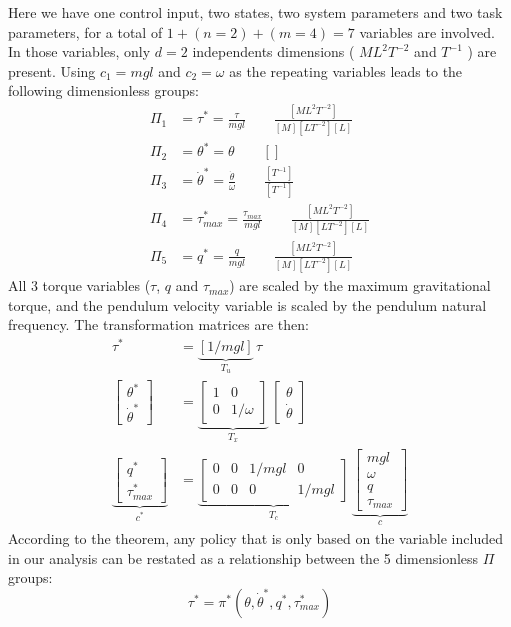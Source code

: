 Here we have one control input, two states, two system parameters and two task parameters, for a total of $1+(n=2)+(m=4)=7$ variables are involved. In those variables, only $d=2$ independents dimensions ( $ML^2T^{-2}$ and $T^{-1}$ ) are present. Using $c_1 = mgl$ and $c_2 = \omega$ as the repeating variables leads to the following dimensionless groups:
\begin{align}
\Pi_1 &= \tau^* = \frac{\tau}{mgl} \quad \quad \frac{[ML^2T^{-2}]}{[M][LT^{-2}][L]} \\
\Pi_2 &= \theta^* = \theta \quad \quad []\\
\Pi_3 &= \dot{\theta}^* = \frac{ \dot{\theta}  }{ \omega } \quad \quad \frac{[T^{-1}]}{[T^{-1}]} \\
\Pi_4 &= \tau_{max}^* = \frac{\tau_{max}}{mgl} \quad \quad \frac{[ML^2T^{-2}]}{[M][LT^{-2}][L]} \\
\Pi_5 &= q^* = \frac{q}{mgl} \quad \quad \frac{[ML^2T^{-2}]}{[M][LT^{-2}][L]} 
\end{align}
All 3 torque variables ($\tau$, $q$ and $\tau_{max}$) are scaled by the maximum gravitational torque, and the pendulum velocity variable is scaled by the pendulum natural frequency. The transformation matrices are then:
\begin{align}
\tau^* &= 
\underbrace{\left[  1/mgl \right]}_{T_u}
\, \tau  \label{eq:Tupendulum} \\
\begin{bmatrix}
\theta^* \\ \dot{\theta}^*
\end{bmatrix} &= 
\underbrace{
\begin{bmatrix}
    1 & 0 \\ 0 & 1/\omega
\end{bmatrix}
}_{T_x} \, 
\begin{bmatrix}
\theta \\ \dot{\theta}
\end{bmatrix}
 \label{eq:Txpendulum} \\
\underbrace{
\begin{bmatrix}
q^* \\ \tau_{max}^*
\end{bmatrix} 
}_{c^*} 
&= 
\underbrace{
\begin{bmatrix}
 0 & 0  & 1/mgl & 0 \\  0 & 0  & 0 &  1/mgl
\end{bmatrix}
}_{T_c} \, 
\underbrace{
\begin{bmatrix}
mgl \\ \omega \\ q \\ \tau_{max}
\end{bmatrix}
}_{c} 
 \label{eq:Tcpendulum} 
\end{align}
According to the theorem, any policy that is only based on the variable included in our analysis can be restated as a relationship between the 5 dimensionless $\Pi$ groups:
\begin{equation}
\tau^*
=
\pi^* \left(
\theta, \dot{\theta}^*,
q^* , \tau_{max}^* 
\right)
\end{equation}

